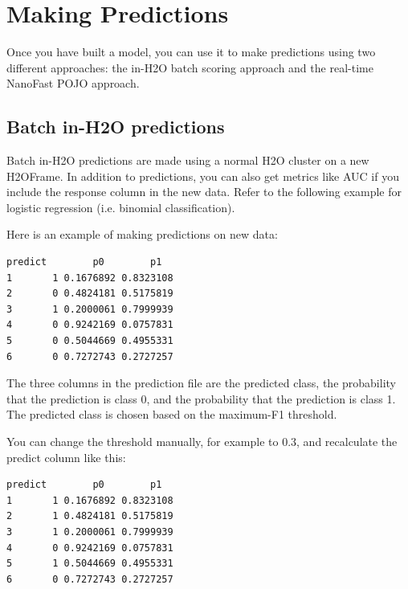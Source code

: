 
\section{Making Predictions}

Once you have built a model, you can use it to make predictions using two different approaches:  the in-H2O batch
scoring approach and the real-time NanoFast POJO approach.

\subsection{Batch in-H2O predictions}

Batch in-H2O predictions are made using a normal H2O cluster on a new H2OFrame.  In addition to predictions, you
can also get metrics like AUC if you include the response column in the new data.  Refer to the following example for logistic regression (i.e. binomial classification).

\bigskip
\waterExampleInR



Here is an example of making predictions on new data:


\begin{lstlisting}[style=output]
  predict        p0        p1
1       1 0.1676892 0.8323108
2       0 0.4824181 0.5175819
3       1 0.2000061 0.7999939
4       0 0.9242169 0.0757831
5       0 0.5044669 0.4955331
6       0 0.7272743 0.2727257
\end{lstlisting}

The three columns in the prediction file are the predicted class, the probability that the prediction is class 0,
and the probability that the prediction is class 1. The predicted class is chosen based on the maximum-F1 threshold.

You can change the threshold manually, for example to 0.3, and recalculate the predict column like this:


\begin{lstlisting}[style=output]
  predict        p0        p1
1       1 0.1676892 0.8323108
2       1 0.4824181 0.5175819
3       1 0.2000061 0.7999939
4       0 0.9242169 0.0757831
5       1 0.5044669 0.4955331
6       0 0.7272743 0.2727257
\end{lstlisting}

